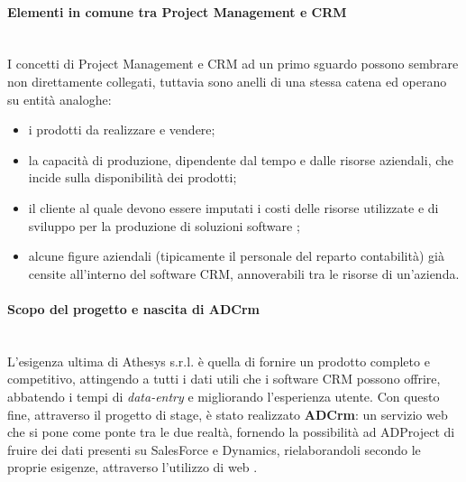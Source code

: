 \documentclass[12pt,a4paper,twoside,openany,english]{book}
\begin{document}
	\paragraph{Elementi in comune tra Project Management e CRM}~\\
		I concetti di Project Management e \gls{CRM} ad un primo sguardo possono sembrare non direttamente collegati, tuttavia sono anelli di una stessa catena ed operano su entità analoghe:
		\begin{itemize}
			\itemsep-0.5em 
			\item i prodotti da realizzare e vendere;
			\item la capacità di produzione, dipendente dal tempo e dalle risorse aziendali, che incide sulla disponibilità dei prodotti;	
			\item il cliente al quale devono essere imputati i costi delle risorse utilizzate e di sviluppo per la produzione di soluzioni software ;
			\item alcune figure aziendali (tipicamente il personale del reparto contabilità) già censite all'interno del software \gls{CRM}, annoverabili tra le risorse di un'azienda.
		\end{itemize}
	\par
	
	\paragraph{Scopo del progetto e nascita di ADCrm}~\\
		L'esigenza ultima di Athesys s.r.l. è quella di fornire un prodotto completo e competitivo, attingendo a tutti i dati utili che i software \gls{CRM} possono offrire, abbatendo i tempi di \textit{data-entry} e migliorando l'esperienza utente. Con questo fine, attraverso il progetto di stage, è stato realizzato \textbf{ADCrm}: un servizio web che si pone come ponte tra le due realtà, fornendo la possibilità ad ADProject di fruire dei dati presenti su SalesForce e Dynamics, rielaborandoli secondo le proprie esigenze, attraverso l'utilizzo di web .
	\par

\tableofcontents
\listoffigures
\listoftables
\mainmatter
\end{document}
